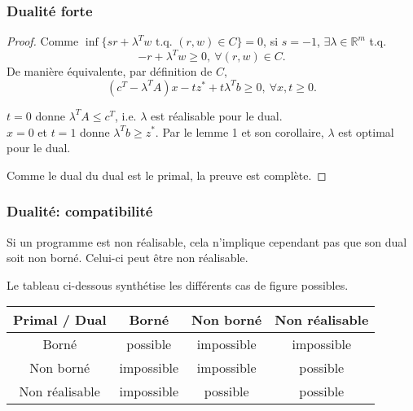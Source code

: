 \documentclass[usepdftitle=false]{beamer}
\def\RR{\mathbb{R}}
\begin{document}
\begin{frame}
\frametitle{Dualité forte}

\begin{proof}
Comme $\inf \lbrace s r + \lambda^T w \mbox{ t.q. } (r,w) \in C \rbrace = 0$, si $s = -1$, $\exists \lambda \in \RR^m$ t.q.
\[
-r + \lambda^Tw \geq 0,\ \forall (r,w) \in C.
\]
De manière équivalente, par définition de $C$,
\[
(c^T-\lambda^TA)x - tz^* + t\lambda^T b \geq 0,\ \forall x, t \geq 0.
\]

\mbox{}

$t = 0$ donne $\lambda^T A \leq c^T$, i.e. $\lambda$ est réalisable pour le dual.\\
$x = 0$ et $t = 1$ donne $\lambda^T b \geq z^*$. Par le lemme 1 et son corollaire, $\lambda$ est optimal pour le dual.

\mbox{}

Comme le dual du dual est le primal, la preuve est complète.
\end{proof}

\end{frame}

\begin{frame}
\frametitle{Dualité: compatibilité}

Si un programme est non réalisable, cela n'implique cependant pas que son dual soit non borné. Celui-ci peut être non réalisable.

\mbox{}

Le tableau ci-dessous synthétise les différents cas de figure possibles.

\begin{center}
\begin{tabular}{|c||c|c|c|}
\hline
Primal / Dual & Borné & Non borné & Non réalisable \\
\hline
\hline
Borné & possible & impossible & impossible \\
\hline
Non borné & impossible & impossible & possible \\
\hline
Non réalisable & impossible & possible & possible \\
\hline
\end{tabular}
\end{center}

\end{frame}
\end{document}
